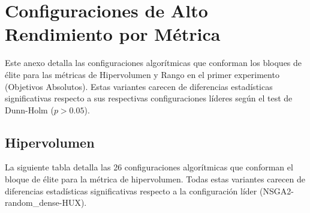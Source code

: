 \chapter{Configuraciones de Alto Rendimiento por Métrica}\label{anexo:elite}

Este anexo detalla las configuraciones algorítmicas que conforman los bloques de élite para las métricas de Hipervolumen y Rango en el primer experimento (Objetivos Absolutos). Estas variantes carecen de diferencias estadísticas significativas respecto a sus respectivas configuraciones líderes según el test de Dunn-Holm ($p > 0.05$).

\section{Hipervolumen}\label{anexo:elite_hv}

La siguiente tabla detalla las 26 configuraciones algorítmicas que conforman el bloque de élite para la métrica de hipervolumen. Todas estas variantes carecen de diferencias estadísticas significativas respecto a la configuración líder (NSGA2-random\_dense-HUX).

